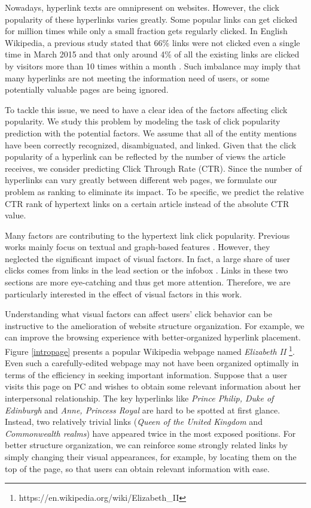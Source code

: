 Nowadays, hyperlink texts are omnipresent on websites. However, the click popularity of these hyperlinks varies greatly. Some popular links can get clicked for million times while only a small fraction gets regularly clicked. In English Wikipedia, a previous study \cite{paranjape2016improving} stated that 66\% links were not clicked even a single time in March 2015 and that only around 4\% of all the existing links are clicked by visitors more than 10 times within a month \cite{dimitrov2017makes}. Such imbalance may imply that many hyperlinks are not meeting the information need of users, or some potentially valuable pages are being ignored. 

To tackle this issue, we need to have a clear idea of the factors affecting click popularity. We study this problem by modeling the task of click popularity prediction with the potential factors. We assume that all of the entity mentions have been correctly recognized, disambiguated, and linked. Given that the click popularity of a hyperlink can be reflected by the number of views the article receives, we consider predicting Click Through Rate (CTR). Since the number of hyperlinks can vary greatly between different web pages, we formulate our problem as ranking to eliminate its impact. To be specific, we predict the relative CTR rank of hypertext links on a certain article instead of the absolute CTR value.

Many factors are contributing to the hypertext link click popularity.  Previous works mainly focus on textual and graph-based features \cite{thruesen2016link, yamada2018linkify}. However, they neglected the significant impact of visual factors. In fact, a large share of user clicks comes from links in the lead section or the infobox \cite{lamprecht2017structure}. Links in these two sections are more eye-catching and thus get more attention. Therefore, we are particularly interested in the effect of visual factors in this work. 

Understanding what visual factors can affect users' click behavior can be instructive to the amelioration of website structure organization. For example, we can improve the browsing experience with better-organized hyperlink placement. Figure \ref{intropage} presents a popular Wikipedia webpage named \emph{Elizabeth II} \footnote{https://en.wikipedia.org/wiki/Elizabeth\_II}. Even such a carefully-edited webpage may not have been organized optimally in terms of the efficiency in seeking important information. Suppose that a user visits this page on PC and wishes to obtain some relevant information about her interpersonal relationship. The key hyperlinks like \emph{Prince Philip, Duke of Edinburgh} and \emph{Anne, Princess Royal} are hard to be spotted at first glance. Instead, two relatively trivial links (\emph{Queen of the United Kingdom} and \emph{Commonwealth realms}) have appeared twice in the most exposed positions. For better structure organization, we can reinforce some strongly related links by simply changing their visual appearances, for example, by locating them on the top of the page, so that users can obtain relevant information with ease. 

